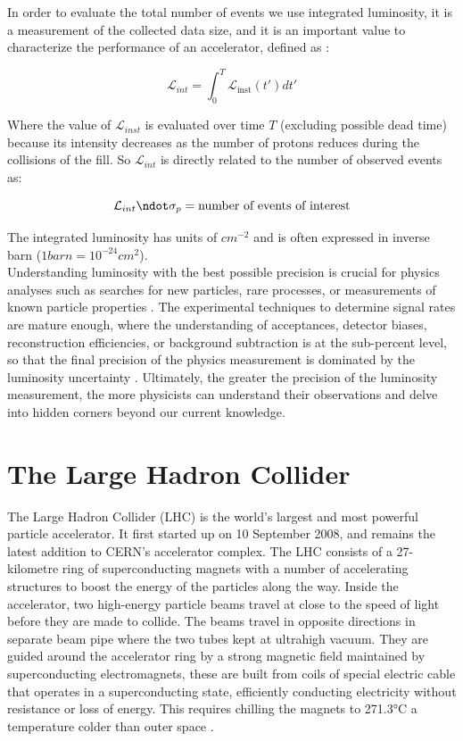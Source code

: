 In order to evaluate the total number of events we use integrated luminosity, it is a measurement of the collected data size, and it is an important value to characterize the performance of an accelerator, defined as \cite{concept_of_luminosity}:

\begin{equation}
  \mathcal{L}_{int}=\int_{0}^{T} \mathcal {L}_{\text{inst}}(t') dt'
\end{equation}

Where the value of $\mathcal{L}_{inst}$ is evaluated over time $T$ (excluding possible dead time) because its intensity decreases as the number of protons reduces during the collisions of the fill. So $\mathcal{L}_{int}$ is directly related to the number of observed events as:

\begin{equation}
  \mathcal{L}_{int} \ndot \sigma_{p}= \text{number of events of interest}
\end{equation}

The integrated luminosity has units of $cm^{-2}$ and is often expressed in inverse barn ($1 barn= 10^{-24}cm^{2}$). \\

Understanding luminosity with the best possible precision is crucial for physics analyses such as searches for new particles, rare processes, or measurements of known particle properties \cite{lumi_motiv}.
The experimental techniques to determine signal rates are mature enough, where the understanding of acceptances, detector biases, reconstruction efficiencies, or background subtraction is at the sub-percent level, so that the final precision of the physics measurement is dominated by the luminosity uncertainty \cite{lumi_paper_def_and_concept}. Ultimately, the greater the precision of the luminosity measurement, the more physicists can understand their observations and delve into hidden corners beyond our current knowledge.

\section{The Large Hadron Collider}

The Large Hadron Collider (LHC) is the world’s largest and most powerful particle accelerator. It first started up on 10 September 2008, and remains the latest addition to CERN’s accelerator complex. The LHC consists of a 27-kilometre ring of superconducting magnets with a number of accelerating structures to boost the energy of the particles along the way. Inside the accelerator, two high-energy particle beams travel at close to the speed of light before they are made to collide. The beams travel in opposite directions in separate beam pipe where the two tubes kept at ultrahigh vacuum. They are guided around the accelerator ring by a strong magnetic field maintained by superconducting electromagnets, these are built from coils of special electric cable that operates in a superconducting state, efficiently conducting electricity without resistance or loss of energy. This requires chilling the magnets to 271.3°C  a temperature colder than outer space \cite{LHC}.\\ 

